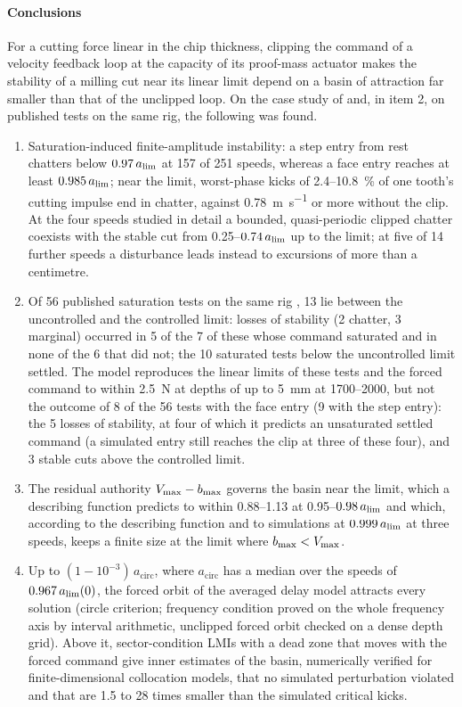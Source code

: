 \paragraph{Conclusions}
For a cutting force linear in the chip thickness, clipping the command of a velocity feedback loop at the capacity of its proof-mass actuator makes the stability of a milling cut near its linear limit depend on a basin of attraction far smaller than that of the unclipped loop. On the case study of \citet{ozsoy2026robust} and, in item 2, on published tests on the same rig, the following was found.
\begin{enumerate}
\item Saturation-induced finite-amplitude instability: a step entry from rest chatters below $0.97\,a_{\lim}$ at 157 of 251 speeds, whereas a face entry reaches at least $0.985\,a_{\lim}$; near the limit, worst-phase kicks of 2.4--\SI{10.8}{\percent} of one tooth's cutting impulse end in chatter, against \SI{0.78}{\metre\per\second} or more without the clip. At the four speeds studied in detail a bounded, quasi-periodic clipped chatter coexists with the stable cut from 0.25--$0.74\,a_{\lim}$ up to the limit; at five of 14 further speeds a disturbance leads instead to excursions of more than a centimetre.
\item Of 56 published saturation tests on the same rig \citep{ozsoy2025frequency}, 13 lie between the uncontrolled and the controlled limit: losses of stability (2 chatter, 3 marginal) occurred in 5 of the 7 of these whose command saturated and in none of the 6 that did not; the 10 saturated tests below the uncontrolled limit settled. The model reproduces the linear limits of these tests and the forced command to within \SI{2.5}{\newton} at depths of up to \SI{5}{\milli\metre} at 1700--\SI{2000}{\rpm}, but not the outcome of 8 of the 56 tests with the face entry (9 with the step entry): the 5 losses of stability, at four of which it predicts an unsaturated settled command (a simulated entry still reaches the clip at three of these four), and 3 stable cuts above the controlled limit.
\item The residual authority $V_{\max}-b_{\max}$ governs the basin near the limit, which a describing function predicts to within 0.88--1.13 at 0.95--$0.98\,a_{\lim}$ and which, according to the describing function and to simulations at $0.999\,a_{\lim}$ at three speeds, keeps a finite size at the limit where $b_{\max}<V_{\max}$.
\item Up to $(1-10^{-3})\,a_{\mathrm{circ}}$, where $a_{\mathrm{circ}}$ has a median over the speeds of $0.967\,a_{\lim}(0)$, the forced orbit of the averaged delay model attracts every solution (circle criterion; frequency condition proved on the whole frequency axis by interval arithmetic, unclipped forced orbit checked on a dense depth grid). Above it, sector-condition LMIs with a dead zone that moves with the forced command give inner estimates of the basin, numerically verified for finite-dimensional collocation models, that no simulated perturbation violated and that are 1.5 to 28 times smaller than the simulated critical kicks.

\end{enumerate}

